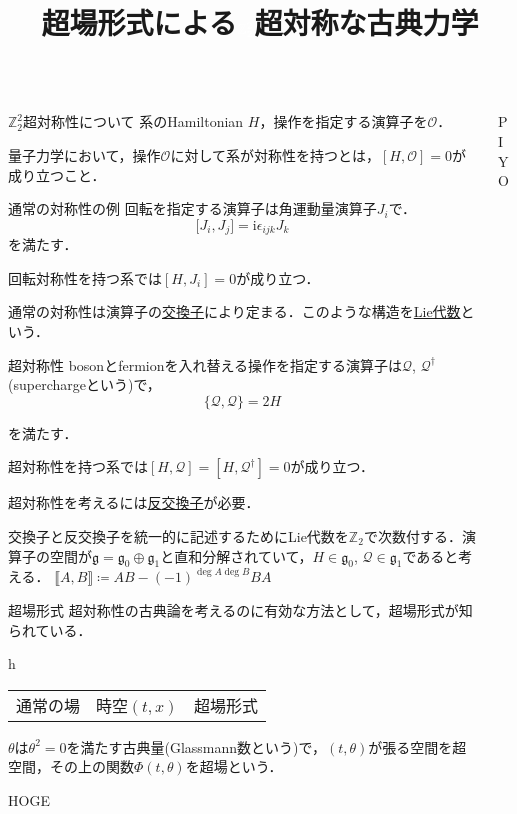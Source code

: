 \documentclass[dvipdfmx]{beamer}
\author{\inst{1}}
\institute{\inst{1}大阪公理}
\title[\textcolor{white}{}]{超場形式による$\textcolor{white}{\mathbf{\Ztt}}$超対称な古典力学}
\newcommand{\Z}{\mathbb{Z}}
\newcommand{\Ztt}{\mathbb{Z}_2^2}
\renewcommand{\i}{\mathrm{i}}
\newcommand{\Q}{\mathcal{Q}}
\newcommand{\g}{\mathfrak{g}}
\renewcommand{\acomm}[2]{\mathbf{\{} #1, #2 \mathbf{\}}}
\renewcommand{\comm}[2]{\mathbf{[} #1, #2 \mathbf{]}}
\newcommand{\zcomm}[2]{\mathbf{\llbracket} #1, #2 \mathbf{\rrbracket}}
\begin{document}
\begin{frame}
\begin{columns}[t]
		\begin{column}{0.47\textwidth}
				\begin{block}{$\Ztt$超対称性について}
							系のHamiltonian $H$，操作を指定する演算子を$\mathcal{O}$．

							量子力学において，操作$\mathcal{O}$に対して系が対称性を持つとは，$[H, \mathcal{O}] = 0$が成り立つこと．
					\begin{itembox}[l]{通常の対称性の例}
							回転を指定する演算子は角運動量演算子$J_i$で．
							\[\comm{J_i}{J_j} = \i\epsilon_{ijk}J_k\]
							を満たす．

							回転対称性を持つ系では$[H, J_i] = 0$が成り立つ．
					\end{itembox}
					通常の対称性は演算子の\underline{交換子}により定まる．このような構造を\underline{Lie代数}という．
					\begin{itembox}[l]{超対称性}
						bosonとfermionを入れ替える操作を指定する演算子は$\Q$, $\Q^\dag$ (superchargeという)で，
						\[\acomm{\Q}{\Q} =2 H\]

						を満たす．

						超対称性を持つ系では$[H, \Q] = [H, \Q^\dag] = 0$が成り立つ．
					\end{itembox}
					超対称性を考えるには\underline{\alert{反}交換子}が必要．

					交換子と反交換子を統一的に記述するためにLie代数を$\Z_2$で次数付する．演算子の空間が$\g = \g_0 \oplus \g_1$と直和分解されていて，$H\in \g_0$, $\Q\in \g_1$であると考える．
					$\zcomm{A}{B}\coloneqq AB - (-1)^{\deg A\deg B}BA$
				\end{block}

				\begin{block}{超場形式}
					超対称性の古典論を考えるのに有効な方法として，超場形式が知られている．

					\begin{table}{h}
						\centering
						\begin{tabular}{ccc}
							通常の場 & 時空$(t, x)$ & 	
							超場形式
						\end{tabular}
					\end{table}
					$\theta$は$\theta^2 = 0$を満たす古典量(Glassmann数という)で，$(t, \theta)$が張る空間を超空間，その上の関数$\Phi(t, \theta)$を超場という．


				\end{block}


				\begin{block}{HOGE}
				\end{block}
		\end{column}
		\begin{column}{0.47\textwidth}
				\begin{block}{PIYO}
				\end{block}
		\end{column}
\end{columns}
\end{frame}
\end{document}
